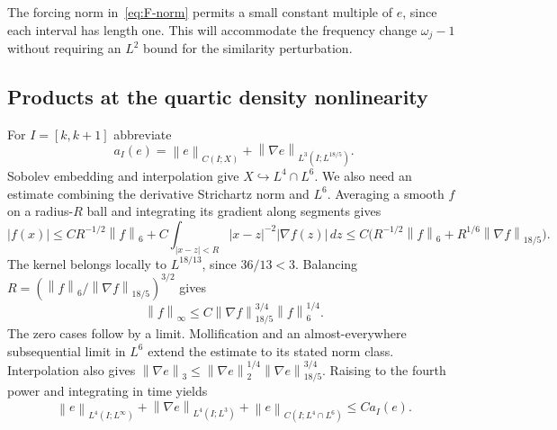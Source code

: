 \documentclass[11pt]{article}
\numberwithin{equation}{section}
\theoremstyle{remark}
\newcommand{\norm}[1]{\left\|#1\right\|}
\begin{document}
The forcing norm in~\eqref{eq:F-norm} permits a small constant multiple
of $e$, since each interval has length one. This will accommodate the
frequency change $\omega_j-1$ without requiring an $L^2$ bound for the
similarity perturbation.

\subsection{Products at the quartic density nonlinearity}

For $I=[k,k+1]$ abbreviate
\[
 a_I(e)=\norm e_{C(I;X)}+
               \norm{\nabla e}_{L^3(I;L^{18/5})}.
\]
Sobolev embedding and interpolation give $X\hookrightarrow L^4\cap L^6$.
We also need an estimate combining the derivative Strichartz norm and
$L^6$. Averaging a smooth $f$ on a radius-$R$ ball and integrating its
gradient along segments gives
\[
 |f(x)|\le C R^{-1/2}\norm f_6+
       C\int_{|x-z|<R}|x-z|^{-2}|\nabla f(z)|\,dz
 \le C\bigl(R^{-1/2}\norm f_6+R^{1/6}\norm{\nabla f}_{18/5}\bigr).
\]
The kernel belongs locally to $L^{18/13}$, since $36/13<3$.
Balancing $R=(\norm f_6/\norm{\nabla f}_{18/5})^{3/2}$ gives
\begin{equation}\label{eq:mixed-GN}
 \norm f_\infty\le C\norm{\nabla f}_{18/5}^{3/4}\norm f_6^{1/4}.
\end{equation}
The zero cases follow by a limit. Mollification and an almost-everywhere
subsequential limit in $L^6$ extend the estimate to its stated norm class.
Interpolation also gives
$\norm{\nabla e}_3\le\norm{\nabla e}_2^{1/4}
\norm{\nabla e}_{18/5}^{3/4}$.
Raising to the fourth power and integrating in time yields
\begin{equation}\label{eq:unit-mixed}
 \norm e_{L^4(I;L^\infty)}+
 \norm{\nabla e}_{L^4(I;L^3)}+
 \norm e_{C(I;L^4\cap L^6)}\le C a_I(e).
\end{equation}
\end{document}
